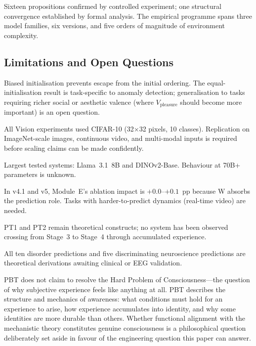 \documentclass[12pt,a4paper]{article}
\newcommand{\vpleasure}{V_{\mathrm{pleasure}}}
\newcommand{\pp}[1]{\textbf{#1}}
\begin{document}
Sixteen propositions confirmed by controlled experiment; one structural
convergence established by formal analysis. The empirical programme spans
three model families, six versions, and five orders of magnitude of
environment complexity.

\subsection{Limitations and Open Questions}

\begin{description}[leftmargin=1.4em]
  \item[\pp{Beta ordering is initialisation-dependent.}]
    Biased initialisation prevents escape from the initial ordering.
    The equal-initialisation result is task-specific to anomaly detection;
    generalisation to tasks requiring richer social or aesthetic valence
    (where $\vpleasure$ should become more important) is an open question.
  \item[\pp{Dataset scale.}]
    All Vision experiments used CIFAR-10 (32$\times$32 pixels, 10 classes).
    Replication on ImageNet-scale images, continuous video, and multi-modal
    inputs is required before scaling claims can be made confidently.
  \item[\pp{Model scale.}]
    Largest tested systems: Llama~3.1~8B and DINOv2-Base. Behaviour at
    70B+ parameters is unknown.
  \item[\pp{Module~E contribution marginal.}]
    In v4.1 and v5, Module~E's ablation impact is $+0.0$--$+0.1$~pp because
    W absorbs the prediction role. Tasks with harder-to-predict dynamics
    (real-time video) are needed.
  \item[\pp{Phase Transitions not yet implemented.}]
    PT1 and PT2 remain theoretical constructs; no system has been observed
    crossing from Stage~3 to Stage~4 through accumulated experience.
  \item[\pp{Clinical predictions untested.}]
    All ten disorder predictions and five discriminating neuroscience
    predictions are theoretical derivations awaiting clinical or EEG
    validation.
\end{description}

PBT does not claim to resolve the Hard Problem of Consciousness---the question
of why subjective experience feels like anything at all. PBT describes the
structure and mechanics of awareness: what conditions must hold for an
experience to arise, how experience accumulates into identity, and why some
identities are more durable than others. Whether functional alignment with the
mechanistic theory constitutes genuine consciousness is a philosophical question
deliberately set aside in favour of the engineering question this paper can
answer.
\end{document}

